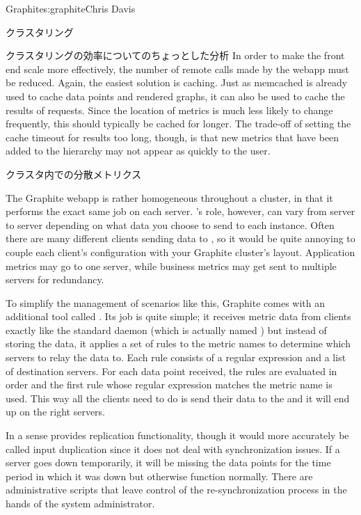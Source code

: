 \begin{aosachapter}{Graphite}{s:graphite}{Chris Davis}
\begin{aosasect1}{クラスタリング}
\begin{aosasect2}{クラスタリングの効率についてのちょっとした分析}
In order to make the front end scale more effectively, the number of
remote  calls made by the webapp must be reduced. Again,
the easiest solution is caching. Just as memcached is already used to
cache data points and rendered graphs, it can also be used to cache
the results of  requests.  Since the location of metrics is
much less likely to change frequently, this should typically be cached
for longer. The trade-off of setting the cache timeout for 
results too long, though, is that new metrics that have been added to
the hierarchy may not appear as quickly to the user.

\end{aosasect2}

\begin{aosasect2}{クラスタ内での分散メトリクス}

The Graphite webapp is rather homogeneous throughout a cluster, in
that it performs the exact same job on each server. 's role,
however, can vary from server to server depending on what data you
choose to send to each instance. Often there are many different
clients sending data to , so it would be quite annoying to
couple each client's configuration with your Graphite cluster's
layout. Application metrics may go to one  server, while
business metrics may get sent to multiple  servers for
redundancy.

To simplify the management of scenarios like this, Graphite comes with
an additional tool called . Its job is quite simple;
it receives metric data from clients exactly like the standard 
daemon (which is actually named ) but instead of storing
the data, it applies a set of rules to the metric names to determine
which  servers to relay the data to. Each rule consists of
a regular expression and a list of destination servers. For each data
point received, the rules are evaluated in order and the first rule
whose regular expression matches the metric name is used. This way all
the clients need to do is send their data to the  and it
will end up on the right servers.

In a sense  provides replication functionality, though it
would more accurately be called input duplication since it does not
deal with synchronization issues. If a server goes down temporarily,
it will be missing the data points for the time period in which it was
down but otherwise function normally. There are administrative scripts
that leave control of the re-synchronization process in the hands of
the system administrator.


\end{aosasect2}
\end{aosasect1}
\end{aosachapter}
